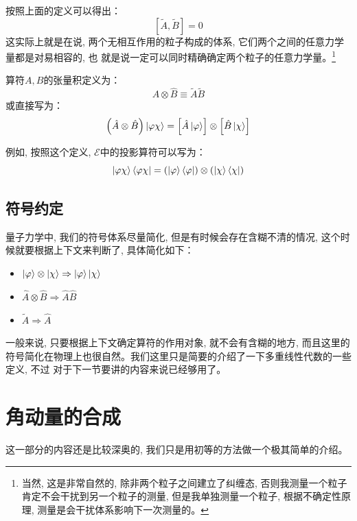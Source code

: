 \documentclass[a4paper,zihao=-4,linespread=1]{ctexrep}
\begin{document}
    按照上面的定义可以得出：\[\left[\tilde{A},\tilde{B}\right]=0\]这实际上就是在说, 两个无相互作用的粒子构成的体系, 它们两个之间的任意力学量都是对易相容的, 也
    就是说一定可以同时精确确定两个粒子的任意力学量。\footnote{当然, 这是非常自然的, 除非两个粒子之间建立了纠缠态, 否则我测量一个粒子肯定不会干扰到另一个粒子的测量, 但是我单独测量一个粒子, 根据不确定性原理, 测量是会干扰体系影响下一次测量的。}

    算符$A,B$的张量积定义为：
    \begin{equation}
        \boxed{
            \hat{A}\otimes\hat{B}\equiv\tilde{A}\tilde{B}
        }
    \end{equation}
    或直接写为：
    \begin{equation}
        \left(\hat{A}\otimes\hat{B}\right)\ket{\varphi\chi}=\left[\hat{A}\ket{\varphi}\right]\otimes\left[\hat{B}\ket{\chi}\right]
    \end{equation}
    
    例如, 按照这个定义, $\mathscr{E}$中的投影算符可以写为：
    \begin{equation}
        \ket{\varphi\chi}\bra{\varphi\chi}=\left(\ket{\varphi}\bra{\varphi}\right)\otimes\left(\ket{\chi}\bra{\chi}\right)
    \end{equation}
    \subsection*{符号约定}
    量子力学中, 我们的符号体系尽量简化, 但是有时候会存在含糊不清的情况, 这个时候就要根据上下文来判断了, 具体简化如下：
    \begin{itemize}
        \item $\ket{\varphi}\otimes\ket{\chi}\Rightarrow\ket{\varphi}\ket{\chi}$
        \item $\hat A\otimes \hat B\Rightarrow \hat{A}\hat{B}$
        \item $\tilde{A}\Rightarrow\hat{A}$
    \end{itemize}
    
    一般来说, 只要根据上下文确定算符的作用对象, 就不会有含糊的地方, 而且这里的符号简化在物理上也很自然。我们这里只是简要的介绍了一下多重线性代数的一些定义, 不过
    对于下一节要讲的内容来说已经够用了。

    \section{角动量的合成}
    这一部分的内容还是比较深奥的, 我们只是用初等的方法做一个极其简单的介绍。
\end{document}
